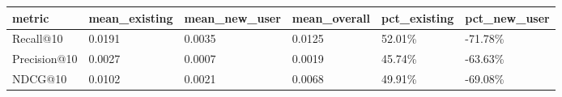 \begin{tabular}{llllll}
\toprule
metric & mean_existing & mean_new_user & mean_overall & pct_existing & pct_new_user \\
\midrule
Recall@10 & 0.0191 & 0.0035 & 0.0125 & 52.01\% & -71.78\% \\
Precision@10 & 0.0027 & 0.0007 & 0.0019 & 45.74\% & -63.63\% \\
NDCG@10 & 0.0102 & 0.0021 & 0.0068 & 49.91\% & -69.08\% \\
\bottomrule
\end{tabular}
